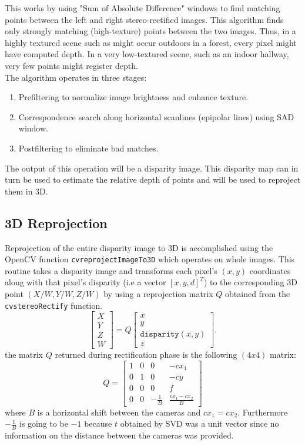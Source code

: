 \documentclass[12pt]{amsart}
\begin{document}
This works by using "Sum of Absolute Difference" windows to find matching points between the left and right stereo-rectified images. 
This algorithm finds only strongly matching (high-texture) points between the two images. Thus, in a highly textured scene such as might occur outdoors in a forest, every pixel might have computed depth. 
In a very low-textured scene, such as an indoor hallway, very few points might register depth.\\
The algorithm operates in three stages:
\begin{enumerate}[label={\arabic*.}]
    \item Prefiltering to normalize image brightness and enhance texture.
    \item Correspondence search along horizontal scanlines (epipolar lines) using SAD window.
    \item Postfiltering to eliminate bad matches.
\end{enumerate}
The output of this operation will be a disparity image. 
This disparity map can in turn be used to estimate the relative depth of points and will be used to reproject them in 3D.
\subsection{3D Reprojection}
Reprojection of the entire disparity image to 3D is accomplished using the OpenCV function \texttt{cvreprojectImageTo3D} which operates on whole images.
This routine takes a disparity image and transforms each pixel's \((x, y)\) coordinates along with that pixel's disparity (i.e a vector \([x, y, d]^T\)) 
to the corresponding 3D point \((X/W, Y/W, Z/W)\) by using a reprojection matrix \(Q\) obtained from the \texttt{cvstereoRectify} function.
\begin{equation*}
    \begin{bmatrix} X \\ Y \\ Z \\ W \end{bmatrix} = Q \begin{bmatrix} x \\ y \\ \texttt{disparity} (x,y) \\ z \end{bmatrix}.
\end{equation*}
the matrix \(Q\) returned during rectification phase is the following \((4x4)\) matrix:
\begin{equation*}
    Q = \begin{bmatrix} 1 & 0 & 0 & -cx_1 \\ 0 & 1 & 0 & -cy \\ 0 & 0 & 0 & f \\ 0 & 0 & -\frac{1}{B} & \frac{cx_1 - cx_2}{B} \end{bmatrix}
\end{equation*}
where \(B\) is a horizontal shift between the cameras and $cx_1=cx_2$.
Furthermore \(-\frac{1}{B}\) is going to be \(-1\) because \(t\) obtained by SVD was a unit vector since no information on the distance between the cameras was provided.
\end{document}
